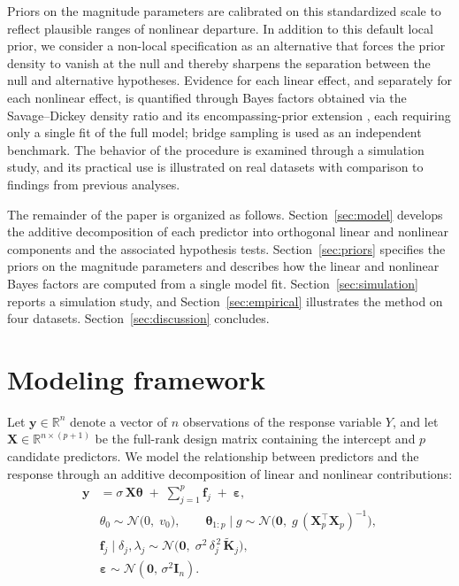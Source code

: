 \documentclass{article}
\begin{document}
Priors on the magnitude parameters are calibrated on this standardized scale to reflect plausible ranges of nonlinear departure. In addition to this default local prior, we consider a non-local specification \parencite{johnson2010nonlocal} as an alternative that forces the prior density to vanish at the null and thereby sharpens the separation between the null and alternative hypotheses. Evidence for each linear effect, and separately for each nonlinear effect, is quantified through Bayes factors obtained via the Savage--Dickey density ratio and its encompassing-prior extension \parencite{Dickey1971, verdinelli1995, wetzels2010encompassing, mulder2022generalization}, each requiring only a single fit of the full model; bridge sampling \parencite{Meng1996, Gronau2017} is used as an independent benchmark. The behavior of the procedure is examined through a simulation study, and its practical use is illustrated on real datasets with comparison to findings from previous analyses.

The remainder of the paper is organized as follows. Section~\ref{sec:model} develops the additive decomposition of each predictor into orthogonal linear and nonlinear components and the associated hypothesis tests. Section~\ref{sec:priors} specifies the priors on the magnitude parameters and describes how the linear and nonlinear Bayes factors are computed from a single model fit. Section~\ref{sec:simulation} reports a simulation study, and Section~\ref{sec:empirical} illustrates the method on four datasets. Section~\ref{sec:discussion} concludes.

\section{Modeling framework\label{sec:model}}

Let $\mathbf{y}\in\mathbb{R}^n$ denote a vector of $n$
observations of the response variable $Y$, and let
$\mathbf{X}\in\mathbb{R}^{n\times(p+1)}$ be the full-rank design matrix
containing the intercept and $p$ candidate predictors.
We model the relationship between predictors and the response through
an additive decomposition of linear and nonlinear contributions:
%
\begin{align}
\label{eq:model}
\mathbf{y}
  &= \sigma\,\mathbf{X}\boldsymbol{\theta}
   \;+\; \sum_{j=1}^{p}\mathbf{f}_j
   \;+\; \boldsymbol{\varepsilon},
\\
\label{eq:prior-theta}
&\theta_0 \sim \mathcal{N}\!\bigl(0,\; v_0\bigr),
\qquad
\boldsymbol{\theta}_{1:p}\mid g
  \sim \mathcal{N}\!\bigl(\mathbf{0},\;
       g\,(\mathbf{X}_{p}^{\!\top}\mathbf{X}_{p})^{-1}\bigr), 
\\
\label{eq:prior-fj}
&\mathbf{f}_j \mid \delta_j,\lambda_j
  \sim \mathcal{N}\!\bigl(\mathbf{0},\;
       \sigma^2\,\delta_j^{\,2}\,\widetilde{\mathbf{K}}_j\bigr),
\\
&\boldsymbol{\varepsilon}
  \sim \mathcal{N}(\mathbf{0},\,\sigma^2\mathbf{I}_n).
\end{align}
\end{document}

